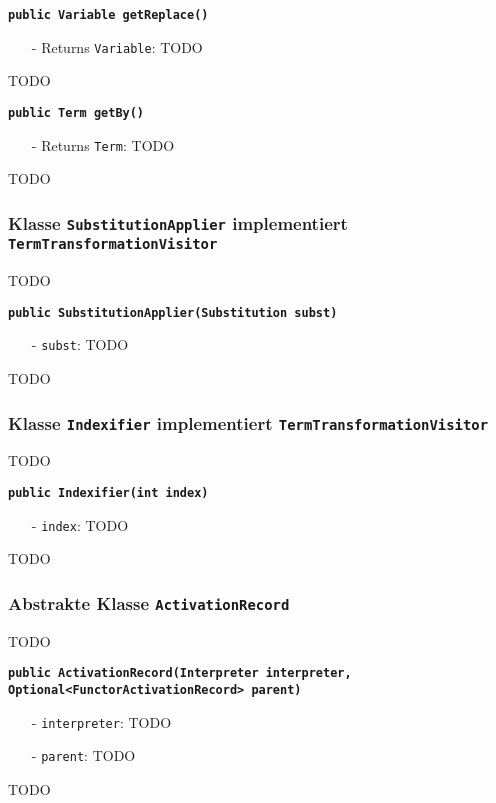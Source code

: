 \documentclass[parskip=full,11pt,twoside]{scrartcl}
\begin{document}
\textbf{\texttt{public Variable getReplace()}}
\begin{itemize}[noitemsep]
	\item[-] Returns \texttt{Variable}: TODO
\end{itemize}
TODO

\textbf{\texttt{public Term getBy()}}
\begin{itemize}[noitemsep]
	\item[-] Returns \texttt{Term}: TODO
\end{itemize}
TODO

\subsubsection{Klasse \texttt{SubstitutionApplier} implementiert \texttt{TermTransformationVisitor}}
TODO

\textbf{\texttt{public SubstitutionApplier(Substitution subst)}}
\begin{itemize}[noitemsep]
	\item[-] \texttt{subst}: TODO
\end{itemize}
TODO

\subsubsection{Klasse \texttt{Indexifier} implementiert \texttt{TermTransformationVisitor}}
TODO

\textbf{\texttt{public Indexifier(int index)}}
\begin{itemize}[noitemsep]
	\item[-] \texttt{index}: TODO
\end{itemize}
TODO

\subsubsection{Abstrakte Klasse \texttt{ActivationRecord}}
TODO

\textbf{\texttt{public ActivationRecord(Interpreter interpreter,\\Optional<FunctorActivationRecord> parent)}}
\begin{itemize}[noitemsep]
	\item[-] \texttt{interpreter}: TODO
	\item[-] \texttt{parent}: TODO
\end{itemize}
TODO
\end{document}
